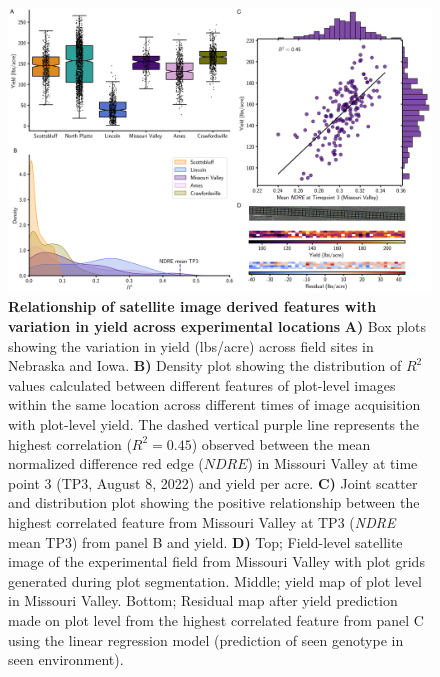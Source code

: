 \documentclass[12pt,twoside]{gsag3jnl}
\begin{document}
\begin{figure}[h]
    \centering
    \includegraphics[width=1\linewidth]{MainFigures/Figure2.png}
    \caption{\textbf{Relationship of satellite image derived features with variation in yield across experimental locations} \textbf{A)} Box plots showing the variation in yield (lbs/acre) across field sites in Nebraska and Iowa. \textbf{B)} Density plot showing the distribution of $R^2$ values calculated between different features of plot-level images within the same location across different times of image acquisition with plot-level yield. The dashed vertical purple line represents the highest correlation ($R^2 = 0.45$) observed between the mean normalized difference red edge ($\textit{NDRE}$) in Missouri Valley at time point 3 (TP3, August 8, 2022) and yield per acre. \textbf{C)} Joint scatter and distribution plot showing the positive relationship between the highest correlated feature from Missouri Valley at TP3 (\textit{NDRE} mean TP3) from panel B and yield. \textbf{D)} Top; Field-level satellite image of the experimental field from Missouri Valley with plot grids generated during plot segmentation. Middle; yield map of plot level in Missouri Valley. Bottom; Residual map after yield prediction made on plot level from the highest correlated feature from panel C using the linear regression model (prediction of seen genotype in seen environment).}
    \label{fig:Figure2}
\end{figure}
\end{document}
